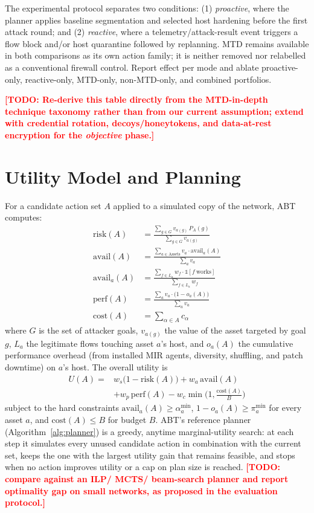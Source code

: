 \documentclass[conference]{IEEEtran}
\newcommand{\todo}[1]{\textcolor{red}{\textbf{[TODO: #1]}}}
\begin{document}
The experimental protocol separates two conditions: (1) \emph{proactive}, where
the planner applies baseline segmentation and selected host hardening before the
first attack round; and (2) \emph{reactive}, where a telemetry/attack-result event
triggers a flow block and/or host quarantine followed by replanning. MTD remains
available in both comparisons as its own action family; it is neither removed nor
relabelled as a conventional firewall control. Report effect per mode and ablate
proactive-only, reactive-only, MTD-only, non-MTD-only, and combined portfolios.

\todo{Re-derive this table directly from the MTD-in-depth~\cite{mtdindepth2026}
technique taxonomy rather than from our current assumption; extend with
credential rotation, decoys/honeytokens, and data-at-rest encryption for the
\emph{objective} phase.}

\section{Utility Model and Planning}
\label{sec:utility}

For a candidate action set $A$ applied to a simulated copy of the network, ABT
computes:
\begin{align}
\mathrm{risk}(A) &= \frac{\sum_{g\in G} v_{a(g)}\, P_A(g)}{\sum_{g\in G} v_{a(g)}} \\
\mathrm{avail}(A) &= \frac{\sum_{a\in \mathrm{Assets}} v_a\cdot\mathrm{avail}_a(A)}{\sum_{a} v_a}\\
\mathrm{avail}_a(A) &= \frac{\sum_{f\in L_a} w_f\cdot\mathbb{1}[f\ \text{works}]}{\sum_{f\in L_a} w_f}\\
\mathrm{perf}(A) &= \frac{\sum_{a} v_a\cdot\big(1-o_a(A)\big)}{\sum_a v_a}\\
\mathrm{cost}(A) &= \sum_{\alpha\in A} c_\alpha
\end{align}
where $G$ is the set of attacker goals, $v_{a(g)}$ the value of the asset targeted by
goal $g$, $L_a$ the legitimate flows touching asset $a$'s host, and $o_a(A)$ the
cumulative performance overhead (from installed MIR agents, diversity, shuffling,
and patch downtime) on $a$'s host. The overall utility is
\begin{equation}
\begin{aligned}
U(A) ={}& w_s\big(1-\mathrm{risk}(A)\big) + w_a\,\mathrm{avail}(A)\\
       &+ w_p\,\mathrm{perf}(A)
       - w_c\min\!\Big(1,\tfrac{\mathrm{cost}(A)}{B}\Big)
\end{aligned}
\label{eq:utility}
\end{equation}
subject to the hard constraints $\mathrm{avail}_a(A)\ge\alpha^{\min}_a$,
$1-o_a(A)\ge\pi^{\min}_a$ for every asset $a$, and $\mathrm{cost}(A)\le B$ for budget
$B$. ABT's reference planner (Algorithm~\ref{alg:planner}) is a greedy, anytime
marginal-utility search: at each step it simulates every unused candidate action in
combination with the current set, keeps the one with the largest utility gain that
remains feasible, and stops when no action improves utility or a cap on plan size is
reached. \todo{compare against an ILP/ MCTS/ beam-search planner and report
optimality gap on small networks, as proposed in the evaluation protocol.}
\end{document}
